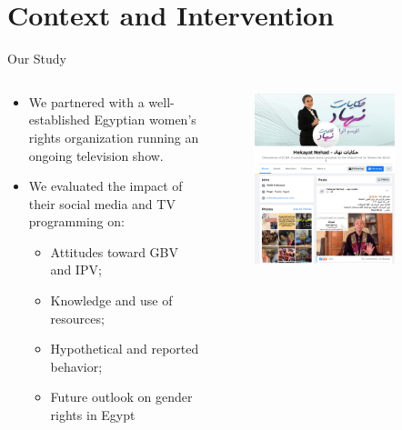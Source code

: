 \documentclass[10pt]{beamer}
\begin{document}
\section{Context and Intervention}
\begin{frame}{Our Study}
\begin{columns}[T]\begin{column}{0.6\textwidth}
\begin{itemize}
    \item We partnered with a well-established Egyptian women's rights organization running an ongoing television show. \vspace{2mm}
    \item We evaluated the impact of their social media and TV programming on: \vspace{2mm}
    \begin{itemize}
        \item Attitudes toward GBV and IPV; \vspace{1mm}
        \item Knowledge and use of resources; \vspace{1mm}
        \item Hypothetical and reported behavior; \vspace{1mm}
        \item Future outlook on gender rights in Egypt
    \end{itemize}
\end{itemize}
\end{column}
\begin{column}{0.5\textwidth}
\begin{figure}
\includegraphics[width = 0.8\textwidth]{Recruit_Intervention/hakayat nehad.png}\captionsetup{font=small, width = 0.9\linewidth}

\end{figure}
\end{column}
\end{columns}
\end{frame}
\end{document}
